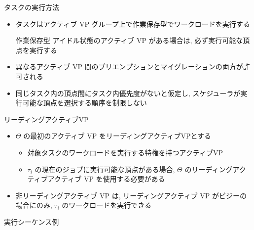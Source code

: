 \begin{frame}{タスクの実行方法}
    \begin{itemize}
        \item タスクはアクティブ VP グループ上で作業保存型でワークロードを実行する
              \begin{block}{作業保存型}
                  アイドル状態のアクティブ VP がある場合は, 必ず実行可能な頂点を実行する
              \end{block}
              \vspace{5mm}
        \item 異なるアクティブ VP 間のプリエンプションとマイグレーションの両方が許可される
        \item 同じタスク内の頂点間にタスク内優先度がないと仮定し, スケジューラが実行可能な頂点を選択する順序を制限しない
    \end{itemize}
\end{frame}

\begin{frame}{リーディングアクティブVP}
    \begin{itemize}
        \item $\Theta$ の最初のアクティブ VP をリーディングアクティブVPとする
              \begin{definition}[リーディングアクティブ VP]
                  \begin{itemize}
                      \item 対象タスクのワークロードを実行する特権を持つアクティブVP
                      \item $\tau_{i}$ の現在のジョブに実行可能な頂点がある場合, $\Theta$ のリーディングアクティブアクティブ VP を使用する必要がある
                  \end{itemize}
              \end{definition}
              \vspace{5mm}
        \item 非リーディングアクティブ VP は, リーディングアクティブ VP がビジーの場合にのみ, $\tau_{i}$ のワークロードを実行できる
    \end{itemize}
\end{frame}

\begin{frame}{実行シーケンス例}
\end{frame}

